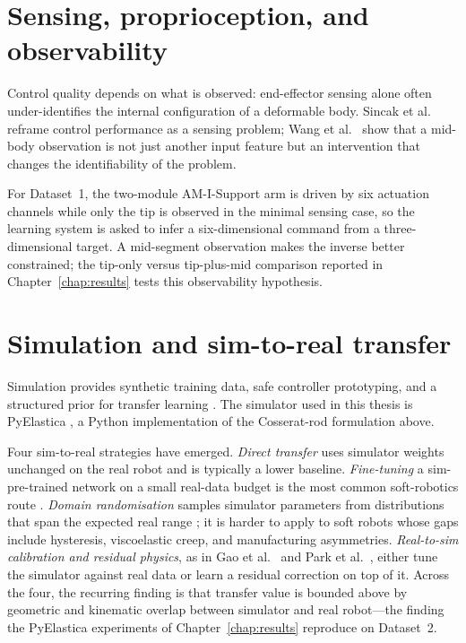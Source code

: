 \section{Sensing, proprioception, and observability}
\label{sec:bg_sensing}

Control quality depends on what is observed: end-effector sensing alone often under-identifies the internal configuration of a deformable body. Sincak et al.\ \cite{sincak2024sensing} reframe control performance as a sensing problem; Wang et al.\ \cite{wang2024proprioception} show that a mid-body observation is not just another input feature but an intervention that changes the identifiability of the problem.

For Dataset~1, the two-module AM-I-Support arm is driven by six actuation channels while only the tip is observed in the minimal sensing case, so the learning system is asked to infer a six-dimensional command from a three-dimensional target. A mid-segment observation makes the inverse better constrained; the tip-only versus tip-plus-mid comparison reported in Chapter~\ref{chap:results} tests this observability hypothesis.

\section{Simulation and sim-to-real transfer}
\label{sec:bg_sim}

Simulation provides synthetic training data, safe controller prototyping, and a structured prior for transfer learning \cite{gazzola2018pyelastica, fang2022jacobian, peng2018simtoreal, gao2024residual, park2025dualae}. The simulator used in this thesis is PyElastica \cite{gazzola2018pyelastica}, a Python implementation of the Cosserat-rod formulation above.

Four sim-to-real strategies have emerged. \emph{Direct transfer} uses simulator weights unchanged on the real robot and is typically a lower baseline. \emph{Fine-tuning} a sim-pre-trained network on a small real-data budget is the most common soft-robotics route \cite{fang2022jacobian}. \emph{Domain randomisation} samples simulator parameters from distributions that span the expected real range \cite{peng2018simtoreal}; it is harder to apply to soft robots whose gaps include hysteresis, viscoelastic creep, and manufacturing asymmetries. \emph{Real-to-sim calibration and residual physics}, as in Gao et al.\ \cite{gao2024residual} and Park et al.\ \cite{park2025dualae}, either tune the simulator against real data or learn a residual correction on top of it. Across the four, the recurring finding is that transfer value is bounded above by geometric and kinematic overlap between simulator and real robot---the finding the PyElastica experiments of Chapter~\ref{chap:results} reproduce on Dataset~2.

